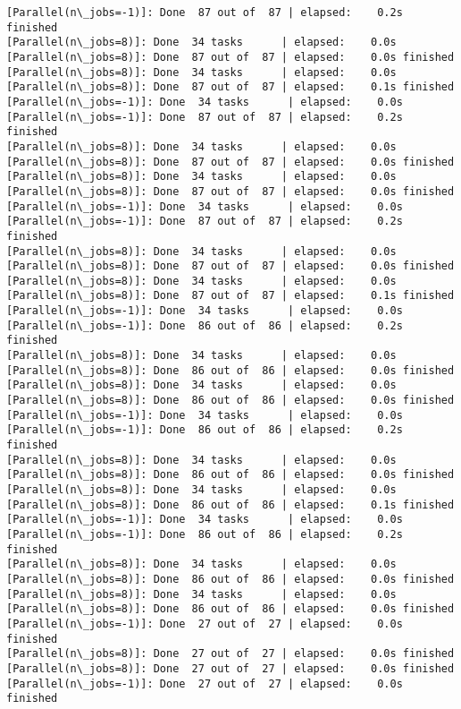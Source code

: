 \documentclass[11pt]{article}
\begin{document}
\begin{Verbatim}[commandchars=\\\{\}]
[Parallel(n\_jobs=-1)]: Done  87 out of  87 | elapsed:    0.2s finished
[Parallel(n\_jobs=8)]: Done  34 tasks      | elapsed:    0.0s
[Parallel(n\_jobs=8)]: Done  87 out of  87 | elapsed:    0.0s finished
[Parallel(n\_jobs=8)]: Done  34 tasks      | elapsed:    0.0s
[Parallel(n\_jobs=8)]: Done  87 out of  87 | elapsed:    0.1s finished
[Parallel(n\_jobs=-1)]: Done  34 tasks      | elapsed:    0.0s
[Parallel(n\_jobs=-1)]: Done  87 out of  87 | elapsed:    0.2s finished
[Parallel(n\_jobs=8)]: Done  34 tasks      | elapsed:    0.0s
[Parallel(n\_jobs=8)]: Done  87 out of  87 | elapsed:    0.0s finished
[Parallel(n\_jobs=8)]: Done  34 tasks      | elapsed:    0.0s
[Parallel(n\_jobs=8)]: Done  87 out of  87 | elapsed:    0.0s finished
[Parallel(n\_jobs=-1)]: Done  34 tasks      | elapsed:    0.0s
[Parallel(n\_jobs=-1)]: Done  87 out of  87 | elapsed:    0.2s finished
[Parallel(n\_jobs=8)]: Done  34 tasks      | elapsed:    0.0s
[Parallel(n\_jobs=8)]: Done  87 out of  87 | elapsed:    0.0s finished
[Parallel(n\_jobs=8)]: Done  34 tasks      | elapsed:    0.0s
[Parallel(n\_jobs=8)]: Done  87 out of  87 | elapsed:    0.1s finished
[Parallel(n\_jobs=-1)]: Done  34 tasks      | elapsed:    0.0s
[Parallel(n\_jobs=-1)]: Done  86 out of  86 | elapsed:    0.2s finished
[Parallel(n\_jobs=8)]: Done  34 tasks      | elapsed:    0.0s
[Parallel(n\_jobs=8)]: Done  86 out of  86 | elapsed:    0.0s finished
[Parallel(n\_jobs=8)]: Done  34 tasks      | elapsed:    0.0s
[Parallel(n\_jobs=8)]: Done  86 out of  86 | elapsed:    0.0s finished
[Parallel(n\_jobs=-1)]: Done  34 tasks      | elapsed:    0.0s
[Parallel(n\_jobs=-1)]: Done  86 out of  86 | elapsed:    0.2s finished
[Parallel(n\_jobs=8)]: Done  34 tasks      | elapsed:    0.0s
[Parallel(n\_jobs=8)]: Done  86 out of  86 | elapsed:    0.0s finished
[Parallel(n\_jobs=8)]: Done  34 tasks      | elapsed:    0.0s
[Parallel(n\_jobs=8)]: Done  86 out of  86 | elapsed:    0.1s finished
[Parallel(n\_jobs=-1)]: Done  34 tasks      | elapsed:    0.0s
[Parallel(n\_jobs=-1)]: Done  86 out of  86 | elapsed:    0.2s finished
[Parallel(n\_jobs=8)]: Done  34 tasks      | elapsed:    0.0s
[Parallel(n\_jobs=8)]: Done  86 out of  86 | elapsed:    0.0s finished
[Parallel(n\_jobs=8)]: Done  34 tasks      | elapsed:    0.0s
[Parallel(n\_jobs=8)]: Done  86 out of  86 | elapsed:    0.0s finished
[Parallel(n\_jobs=-1)]: Done  27 out of  27 | elapsed:    0.0s finished
[Parallel(n\_jobs=8)]: Done  27 out of  27 | elapsed:    0.0s finished
[Parallel(n\_jobs=8)]: Done  27 out of  27 | elapsed:    0.0s finished
[Parallel(n\_jobs=-1)]: Done  27 out of  27 | elapsed:    0.0s finished

\end{Verbatim}
\end{document}
